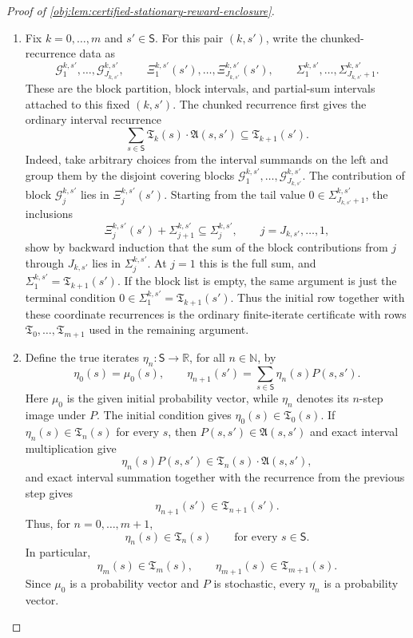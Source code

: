 \documentclass[11pt]{article}
\begin{document}
\begin{proof}[Proof of \cref{obj:lem:certified-stationary-reward-enclosure}]
\begin{enumerate}
\item Fix \(k=0,\ldots,m\) and \(s'\in\mathsf S\).  For this pair \((k,s')\), write the chunked-recurrence data as
\[
\mathcal G^{k,s'}_1,\ldots,\mathcal G^{k,s'}_{J_{k,s'}},
\qquad
\Xi^{k,s'}_1(s'),\ldots,\Xi^{k,s'}_{J_{k,s'}}(s'),
\qquad
\Sigma^{k,s'}_1,\ldots,\Sigma^{k,s'}_{J_{k,s'}+1}.
\]
These are the block partition, block intervals, and partial-sum intervals attached to this fixed \((k,s')\).  The chunked recurrence first gives the ordinary interval recurrence
\[
\sum_{s\in\mathsf S}\mathfrak T_k(s)\cdot\mathfrak A(s,s')
   \subseteq \mathfrak T_{k+1}(s').
\]
Indeed, take arbitrary choices from the interval summands on the left and group them by the disjoint covering blocks \(\mathcal G^{k,s'}_1,\ldots,\mathcal G^{k,s'}_{J_{k,s'}}\).  The contribution of block \(\mathcal G^{k,s'}_j\) lies in \(\Xi^{k,s'}_j(s')\).  Starting from the tail value \(0\in\Sigma^{k,s'}_{J_{k,s'}+1}\), the inclusions
\[
\Xi^{k,s'}_j(s')+\Sigma^{k,s'}_{j+1}\subseteq \Sigma^{k,s'}_j,
\qquad j=J_{k,s'},\ldots,1,
\]
show by backward induction that the sum of the block contributions from \(j\) through \(J_{k,s'}\) lies in \(\Sigma^{k,s'}_j\).  At \(j=1\) this is the full sum, and \(\Sigma^{k,s'}_1=\mathfrak T_{k+1}(s')\).  If the block list is empty, the same argument is just the terminal condition \(0\in\Sigma^{k,s'}_1=\mathfrak T_{k+1}(s')\).  Thus the initial row together with these coordinate recurrences is the ordinary finite-iterate certificate with rows \(\mathfrak T_0,\ldots,\mathfrak T_{m+1}\) used in the remaining argument. %

\item Define the true iterates \(\eta_n:\mathsf S\to\mathbb R\), for all \(n\in\mathbb N\), by
\[
\eta_{0}(s)=\mu_0(s),\qquad
\eta_{n+1}(s')=\sum_{s\in\mathsf S}\eta_n(s)P(s,s').
\]
Here \(\mu_0\) is the given initial probability vector, while \(\eta_n\) denotes its \(n\)-step image under \(P\).  The initial condition gives \(\eta_0(s)\in\mathfrak T_0(s)\).  If \(\eta_n(s)\in\mathfrak T_n(s)\) for every \(s\), then \(P(s,s')\in\mathfrak A(s,s')\) and exact interval multiplication give
\[
\eta_n(s)P(s,s')\in \mathfrak T_n(s)\cdot\mathfrak A(s,s'),
\]
and exact interval summation together with the recurrence from the previous step gives
\[
\eta_{n+1}(s')\in\mathfrak T_{n+1}(s').
\]
Thus, for \(n=0,\ldots,m+1\),
\[
\eta_n(s)\in\mathfrak T_n(s)\qquad\text{for every }s\in\mathsf S.
\]
In particular,
\[
\eta_m(s)\in\mathfrak T_m(s),\qquad
\eta_{m+1}(s)\in\mathfrak T_{m+1}(s).
\]
Since \(\mu_0\) is a probability vector and \(P\) is stochastic, every \(\eta_n\) is a probability vector. %


\end{enumerate}
\end{proof}
\end{document}
